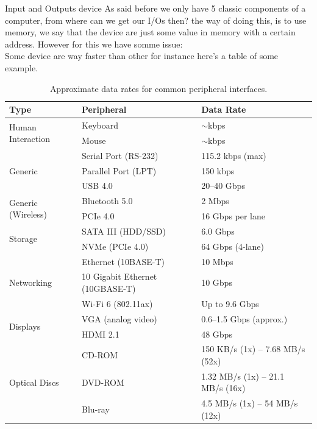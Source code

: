 \begin{parag}{Input and Outputs device}
    As said before we only have 5 classic components of a computer, from where can we get our I/Os then? the way of doing this, is to use memory, we say that the device are just some value in memory with a certain address. However for this we have somme issue:\\
	Some device are way faster than other for instance here's a table of some example.
\end{parag}
	\begin{table}[h!]
\centering
\begin{tabular}{|l|l|l|}
\hline
\textbf{Type} & \textbf{Peripheral} & \textbf{Data Rate} \\ \hline
\multirow{2}{*}{Human Interaction} & Keyboard & $\sim$kbps \\
 & Mouse & $\sim$kbps \\ \hline
\multirow{3}{*}{Generic} & Serial Port (RS-232) & 115.2 kbps (max) \\
 & Parallel Port (LPT) & 150 kbps \\
 & USB 4.0 & 20--40 Gbps \\ \hline
\multirow{2}{*}{Generic (Wireless)} & Bluetooth 5.0 & 2 Mbps \\
 & PCIe 4.0 & 16 Gbps per lane \\ \hline
\multirow{2}{*}{Storage} & SATA III (HDD/SSD) & 6.0 Gbps \\
 & NVMe (PCIe 4.0) & 64 Gbps (4-lane) \\ \hline
\multirow{3}{*}{Networking} & Ethernet (10BASE-T) & 10 Mbps \\
 & 10 Gigabit Ethernet (10GBASE-T) & 10 Gbps \\
 & Wi-Fi 6 (802.11ax) & Up to 9.6 Gbps \\ \hline
\multirow{2}{*}{Displays} & VGA (analog video) & 0.6--1.5 Gbps (approx.) \\
 & HDMI 2.1 & 48 Gbps \\ \hline
\multirow{3}{*}{Optical Discs} & CD-ROM & 150 KB/s (1x) -- 7.68 MB/s (52x) \\
 & DVD-ROM & 1.32 MB/s (1x) -- 21.1 MB/s (16x) \\
 & Blu-ray & 4.5 MB/s (1x) -- 54 MB/s (12x) \\ \hline
\end{tabular}
\caption{Approximate data rates for common peripheral interfaces.}
\end{table}
